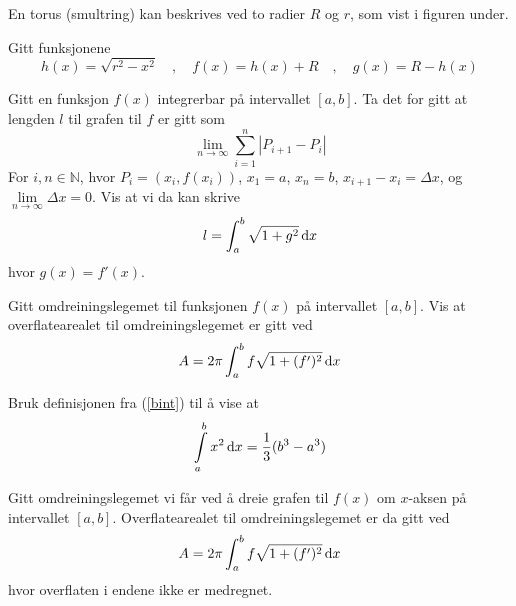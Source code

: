 En torus (smultring) kan beskrives ved to radier $R$ og $r$, som vist i figuren under. \os
 
Gitt funksjonene
\[ h(x)=\sqrt{r^2-x^2}\quad,\quad f(x)=h(x)+R\quad,\quad g(x)=R-h(x)\]
\newpage



Gitt en funksjon $ f(x) $ integrerbar på intervallet $ [a, b] $. Ta det for gitt at lengden $ l $ til grafen til $ f $ er gitt som
\[ \lim_{n\to \infty}\sum\limits_{i=1}^n \left|P_{i+1}-P_i\right| \]
For $ i,n\in\mathbb{N} $, hvor $ P_i =(x_i, f(x_i)) $, $ x_1=a $, $ x_n=b $, $ x_{i+1}-x_i=\Delta x $, og $ \lim\limits_{n\to\infty}\Delta x=0 $.
Vis at vi da kan skrive
\[ l=\int_{a}^{b} \sqrt{1+g^2}\,\text{d}x \]
hvor $ g(x)=f'(x) $.

Gitt omdreiningslegemet til funksjonen $f(x)$ på intervallet $[a, b]$. Vis at overflatearealet til omdreiningslegemet er gitt ved
\[ A=2\pi\int_{a}^{b} f\sqrt{1+(f')^2}\,\text{d}x \]

Bruk definisjonen fra (\ref{bint}) til å vise at
\[ \int\limits_a^b x^2 \,\text{d}x = \frac{1}{3}(b^3-a^3) \]

Gitt omdreiningslegemet vi får ved å dreie grafen til $f(x)$ om $x$-aksen på intervallet $[a, b]$. Overflatearealet til omdreiningslegemet er da gitt ved
\[ A=2\pi\int_{a}^{b} f\sqrt{1+(f')^2}\,\text{d}x \]
hvor overflaten i endene ikke er medregnet. \vsk

